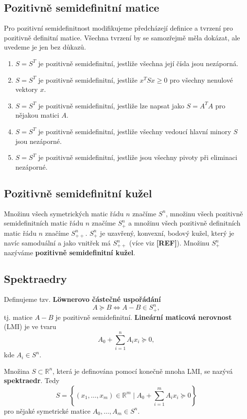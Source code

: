 \subsection*{Pozitivně semidefinitní matice}

Pro pozitivní semidefinitnost modifikujeme předcházejí definice a tvrzení pro pozitivně definitní matice. Všechna tvrzení by se samozřejmě měla dokázat, ale uvedeme je jen bez důkazů.
\begin{enumerate}
    \item $S = S^T$ je pozitivně semidefinitní, jestliže všechna její čísla jsou nezáporná.
    \item $S = S^T$ je pozitivně semidefinitní, jestliže $x^TSx \geq 0$ pro všechny nenulové vektory $x$.
    \item $S = S^T$ je pozitivně semidefinitní, jestliže lze napsat jako $S = A^T A$ pro nějakou matici $A$.
    \item $S = S^T$ je pozitivně semidefinitní, jestliže všechny vedoucí hlavní minory $S$ jsou nezáporné.
    \item $S = S^T$ je pozitivně semidefinitní, jestliže jsou všechny pivoty při eliminaci nezáporné.
\end{enumerate}

\subsection*{Pozitivně semidefinitní kužel}

Množinu všech symetrických matic řádu $n$ značíme $S^n$, množinu všech pozitivně semidefinitních matic řádu $n$ značíme $S_+^n$ a množinu všech pozitivně definitních matic řádu $n$ značíme $S_{++}^n$. $S_+^n$ je uzavřený, konvexní, bodový kužel, který je navíc samoduální a jako vnitřek má $S_{++}^n$ (více viz \textbf{[REF]}). Množinu $S_+^n$ nazýváme \textbf{pozitivně semidefinitní kužel}.


\subsection*{Spektraedry}

Definujeme tzv. \textbf{L\"{o}wnerovo částečné uspořádání}
$$
    A \succeq B \iff A - B \in S_+^n,
$$
tj. matice $A - B$ je pozitivně semidefinitní. \textbf{Lineární maticová nerovnost} (LMI) je ve tvaru
$$
    A_0 + \sum_{i=1}^n A_i x_i \succeq 0,
$$
kde $A_i \in S^n$.

Množina $S \subset \mathbb{R}^n$, která je definována pomocí konečně mnoha LMI, se nazývá \textbf{spektraedr}. Tedy
$$
    S = \left\{ (x_1, \dots, x_m) \in \mathbb{R}^m \mid A_0 + \sum_{i=1}^m A_i x_i \succeq 0 \right\}
$$
pro nějaké symetrické matice $A_0, \dots, A_m \in S^n$.

